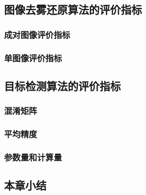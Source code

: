 \subsection{图像去雾还原算法的评价指标}

\subsubsection{成对图像评价指标}

\subsubsection{单图像评价指标}

\subsection{目标检测算法的评价指标}

\subsubsection{混淆矩阵}

\subsubsection{平均精度}

\subsubsection{参数量和计算量}


\subsection{本章小结}





